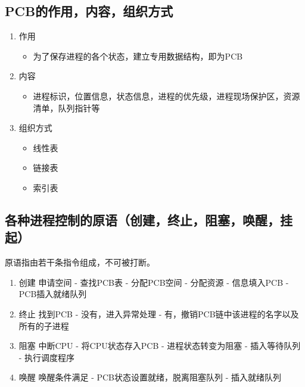 \documentclass[11pt]{article}
\begin{document}
\subsection{PCB的作用，内容，组织方式}
\label{sec-2-3}
\begin{enumerate}
\item 作用
\label{sec-2-3-0-1}
\begin{itemize}
\item 为了保存进程的各个状态，建立专用数据结构，即为PCB
\end{itemize}
\item 内容
\label{sec-2-3-0-2}
\begin{itemize}
\item 进程标识，位置信息，状态信息，进程的优先级，进程现场保护区，资源清单，队列指针等
\end{itemize}
\item 组织方式
\label{sec-2-3-0-3}
\begin{itemize}
\item 线性表
\item 链接表
\item 索引表
\end{itemize}
\end{enumerate}
\subsection{各种进程控制的原语（创建，终止，阻塞，唤醒，挂起）}
\label{sec-2-4}
原语指由若干条指令组成，不可被打断。
\begin{enumerate}
\item 创建
\label{sec-2-4-0-1}
申请空间 - 查找PCB表 - 分配PCB空间 - 分配资源 - 信息填入PCB - PCB插入就绪队列
\item 终止
\label{sec-2-4-0-2}
找到PCB - 没有，进入异常处理 - 有，撤销PCB链中该进程的名字以及所有的子进程
\item 阻塞
\label{sec-2-4-0-3}
中断CPU - 将CPU状态存入PCB - 进程状态转变为阻塞 - 插入等待队列 - 执行调度程序
\item 唤醒
\label{sec-2-4-0-4}
唤醒条件满足 - PCB状态设置就绪，脱离阻塞队列 - 插入就绪队列
\end{enumerate}
\end{document}
